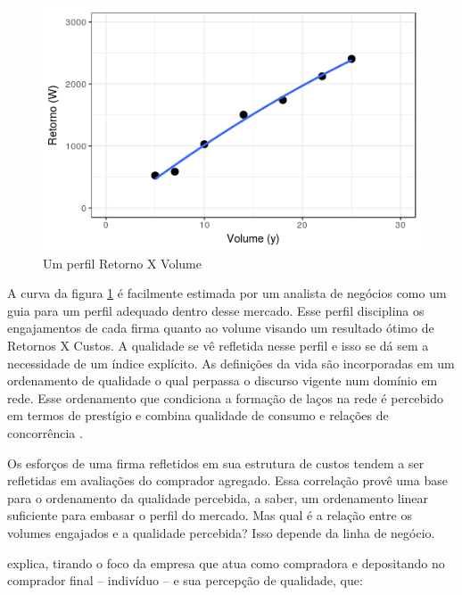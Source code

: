 \documentclass[a4paper, 12pt, openright, oneside, german, french, english, brazil]{abntex2}
\begin{document}
	\begin{figure}[ht]
		\centering
		\caption{Um perfil Retorno X Volume}
		\label{white_1.2}
		\includegraphics[scale=1]{white_1_2.png}
	\end{figure}
	
	A curva da figura \ref{white_1.2} é facilmente estimada por um analista de negócios como um guia para um perfil adequado dentro desse mercado. Esse perfil disciplina os engajamentos de cada firma quanto ao volume visando um resultado ótimo de Retornos X Custos. A qualidade se vê refletida nesse perfil e isso se dá sem a necessidade de um índice explícito. As definições da vida são incorporadas em um ordenamento de qualidade o qual perpassa o discurso vigente num domínio em rede. Esse ordenamento que condiciona a formação de laços na rede é percebido em termos de prestígio e combina qualidade de consumo e relações de concorrência \cite{white2002markets}.
	
	Os esforços de uma firma refletidos em sua estrutura de custos tendem a ser refletidas em avaliações do comprador agregado. Essa correlação provê uma base para o ordenamento da qualidade percebida, a saber, um ordenamento linear suficiente para embasar o perfil do mercado. Mas qual é a relação entre os volumes engajados e a qualidade percebida? Isso depende da linha de negócio.
	
	 explica, tirando o foco da empresa que atua como compradora e depositando no comprador final -- indivíduo -- e sua percepção de qualidade, que:
	
\end{document}
